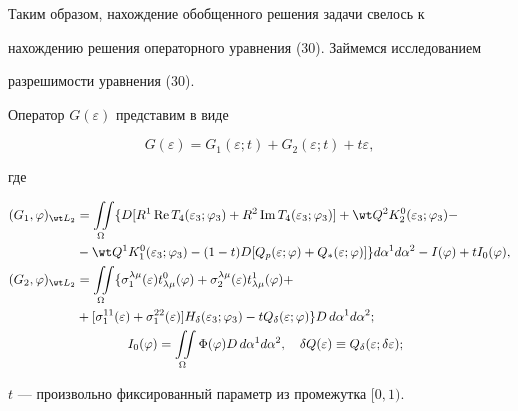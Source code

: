  


Таким образом, нахождение обобщенного решения задачи свелось к 


нахождению решения операторного уравнения (30). Займемся исследованием 


разрешимости уравнения (30). 


 


\begin{lem} Оператор $G(\varepsilon)$ представим в виде 


$$ 


G(\varepsilon)=G_1(\varepsilon;t)+G_2(\varepsilon;t)+ 


t\varepsilon, 


$$ 


где  


\begin{align} 


(G_1,\varphi)_{\wt L_2}&=\iint\limits_\Omega\{D[R^1\re T_4 


(\varepsilon_3;\varphi_3)+R^2\im T_4(\varepsilon_3;\varphi_3)]+ 


\wt Q^2 K^0_2(\varepsilon_3;\varphi_3)-\notag \\ 


&-\wt Q^1 K^0_1(\varepsilon_3;\varphi_3)-(1-t)D[ 


Q_p(\varepsilon;\varphi)+Q_*(\varepsilon;\varphi)]\} 


d\alpha^1d\alpha^2-I(\varphi)+t I_0(\varphi), \\ 


% 


(G_2,\varphi)_{\wt L_2}&=\iint\limits_\Omega\{ 


\sigma^{\lambda\mu}_1(\varepsilon)t^0_{\lambda\mu}(\varphi)+ 


\sigma^{\lambda\mu}_2(\varepsilon)t^1_{\lambda\mu}(\varphi)+\notag \\ 


&+[\sigma^{11}_1(\varepsilon)+\sigma^{22}_1(\varepsilon)] 


H_\delta(\varepsilon_3;\varphi_3)-t Q_\delta(\varepsilon;\varphi)\} 


D\,d\alpha^1d\alpha^2; \\ 


% 


&\qquad\qquad I_0(\varphi)=\iint\limits_\Omega 


\Phi(\varphi)D\,d\alpha^1d\alpha^2,\quad \delta Q(\varepsilon)\equiv 


Q_\delta(\varepsilon;\delta\varepsilon);\notag 


\end{align} 


$t$ --- произвольно фиксированный параметр из промежутка $[0,1)$. 


\end{lem} 


